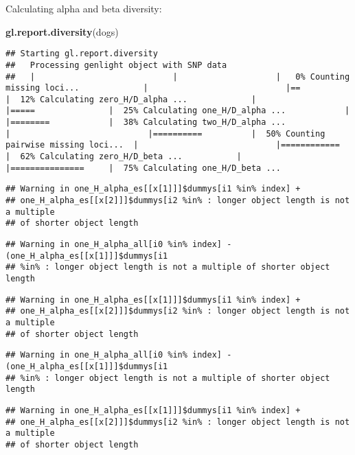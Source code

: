 \documentclass[
]{article}
\newenvironment{Shaded}{\begin{snugshade}}{\end{snugshade}}
\newcommand{\FunctionTok}[1]{\textcolor[rgb]{0.13,0.29,0.53}{\textbf{#1}}}
\newcommand{\NormalTok}[1]{#1}
\begin{document}
Calculating alpha and beta diversity:

\begin{Shaded}
\begin{Highlighting}[]
\FunctionTok{gl.report.diversity}\NormalTok{(dogs) }
\end{Highlighting}
\end{Shaded}

\begin{verbatim}
## Starting gl.report.diversity 
##   Processing genlight object with SNP data
##   |                            |                    |   0% Counting missing loci...             |                            |==                  |  12% Calculating zero_H/D_alpha ...             |                            |=====               |  25% Calculating one_H/D_alpha ...            |                            |========            |  38% Calculating two_H/D_alpha ...             |                            |==========          |  50% Counting pairwise missing loci...  |                            |============        |  62% Calculating zero_H/D_beta ...           |                            |===============     |  75% Calculating one_H/D_beta ...
\end{verbatim}

\begin{verbatim}
## Warning in one_H_alpha_es[[x[1]]]$dummys[i1 %in% index] +
## one_H_alpha_es[[x[2]]]$dummys[i2 %in% : longer object length is not a multiple
## of shorter object length
\end{verbatim}

\begin{verbatim}
## Warning in one_H_alpha_all[i0 %in% index] - (one_H_alpha_es[[x[1]]]$dummys[i1
## %in% : longer object length is not a multiple of shorter object length
\end{verbatim}

\begin{verbatim}
## Warning in one_H_alpha_es[[x[1]]]$dummys[i1 %in% index] +
## one_H_alpha_es[[x[2]]]$dummys[i2 %in% : longer object length is not a multiple
## of shorter object length
\end{verbatim}

\begin{verbatim}
## Warning in one_H_alpha_all[i0 %in% index] - (one_H_alpha_es[[x[1]]]$dummys[i1
## %in% : longer object length is not a multiple of shorter object length
\end{verbatim}

\begin{verbatim}
## Warning in one_H_alpha_es[[x[1]]]$dummys[i1 %in% index] +
## one_H_alpha_es[[x[2]]]$dummys[i2 %in% : longer object length is not a multiple
## of shorter object length
\end{verbatim}
\end{document}
